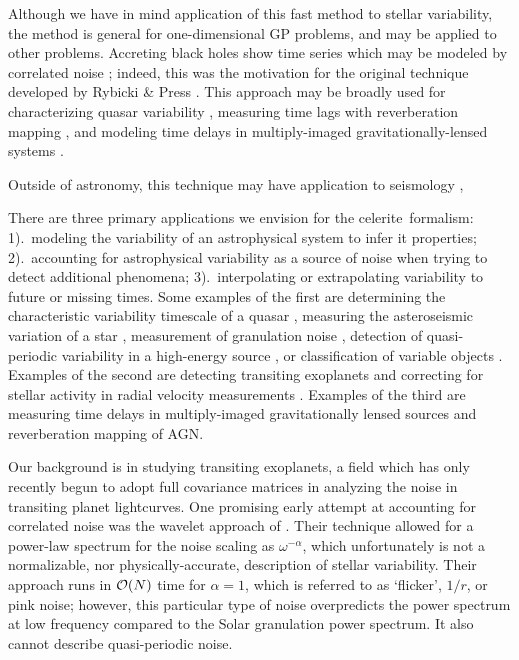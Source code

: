 \documentclass[manuscript, letterpaper]{aastex6}
\makeatletter
\let\origsection\section
\renewcommand\section{\@ifstar{\starsection}{\nostarsection}}
\newcommand\nostarsection[1]{\sectionprelude\origsection{#1}}
\newcommand\starsection[1]{\sectionprelude\origsection*{#1}}
\newcommand\sectionprelude{\vspace{1em}}
\newcommand{\project}[1]{\textsf{#1}}
\newcommand{\celerite}{\project{celerite}}
\makeatother
\begin{document}
\section{Summary}

Although we have in mind application of this fast method to stellar variability,
the method is general for one-dimensional GP problems, and may be applied to
other problems.  Accreting black holes show time series which
may be modeled by correlated noise \citep{Kelly:2014};  indeed, this was the
motivation for the original technique developed by Rybicki \& Press \citep{Rybicki:1992,Rybicki:1995}.
This approach may be broadly used for characterizing quasar variability
\citep{MacLeod:2010}, measuring time lags with reverberation mapping
\citep{Zu:2011}, and modeling time delays in multiply-imaged
gravitationally-lensed systems \citep{Press:1998}.

Outside of astronomy, this technique may have application to seismology
\citep{Robinson:1967},

There are three primary applications we envision for the \celerite\ formalism: 1).\ modeling
the variability of an astrophysical system to infer it properties; 2).\
accounting for astrophysical variability as a source of noise when trying to detect
additional phenomena; 3).\ interpolating or extrapolating variability to future or missing
times.  Some examples of the first are determining the characteristic
variability timescale of a quasar \citep{Kelly:2014}, measuring the asteroseismic variation of a star
\citep{Corsaro:2014}, measurement of granulation noise \citep{Bastien:2013,Kallinger:2016},
detection of quasi-periodic variability in a high-energy source \citep{McAllister:2016},
or classification of variable objects \citep{Zinn:2016}.  Examples of the
second are detecting transiting exoplanets and correcting for stellar activity in
radial velocity measurements \citep{Haywood:2014,Rajpaul:2015}. Examples of the third are 
measuring time delays in
multiply-imaged gravitationally lensed sources \citep{Tewes:2013} and reverberation mapping of AGN.

Our background is in studying transiting exoplanets, a field which has only recently begun
to adopt full covariance matrices in analyzing the noise in transiting planet lightcurves.
One promising early attempt at accounting for correlated noise was the wavelet approach
of \citet{Carter:2009}.  Their technique allowed for a power-law spectrum for the
noise scaling as $\omega^{-\alpha}$, which unfortunately is not a normalizable, nor
physically-accurate, description of stellar variability.  Their approach runs in
${\cal O}(N)$ time for $\alpha=1$, which is referred to as `flicker', $1/r$, or pink 
noise;  however, this particular type of noise overpredicts the power spectrum at low 
frequency compared to the Solar granulation power spectrum.  It also cannot describe 
quasi-periodic noise.
\end{document}
